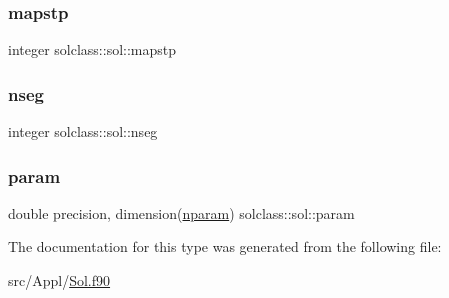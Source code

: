 \mbox{\label{structsolclass_1_1sol_a3821a5713cb3e0e9ae5359b42644b860}} 
\subsubsection{\texorpdfstring{mapstp}{mapstp}}
{\footnotesize\ttfamily integer solclass\+::sol\+::mapstp}

\mbox{\label{structsolclass_1_1sol_a4e0b71eae9d2072fd83b1a4e524da7fc}} 
\subsubsection{\texorpdfstring{nseg}{nseg}}
{\footnotesize\ttfamily integer solclass\+::sol\+::nseg}

\mbox{\label{structsolclass_1_1sol_a70efaac352dbf744000a92effd3d814b}} 
\subsubsection{\texorpdfstring{param}{param}}
{\footnotesize\ttfamily double precision, dimension(\mbox{\hyperlink{namespacesolclass_abb5af39a08a5ff2cbe713621b2727eaf}{nparam}}) solclass\+::sol\+::param}



The documentation for this type was generated from the following file\+:\begin{DoxyCompactItemize}
\item 
src/\+Appl/\mbox{\hyperlink{_sol_8f90}{Sol.\+f90}}\end{DoxyCompactItemize}
